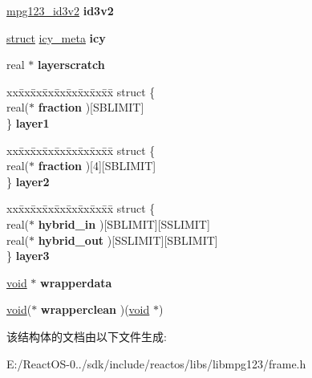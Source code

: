\begin{DoxyCompactItemize}
\hyperlink{structmpg123__id3v2}{mpg123\+\_\+id3v2} {\bfseries id3v2}
\item 
\mbox{\label{structmpg123__handle__struct_a3440b05432bb42929d1a075aa1b77ca1}} 
\hyperlink{interfacestruct}{struct} \hyperlink{structicy__meta}{icy\+\_\+meta} {\bfseries icy}
\item 
\mbox{\label{structmpg123__handle__struct_ab121656ea746d2254a9fa8f7f653523c}} 
real $\ast$ {\bfseries layerscratch}
\item 
\mbox{\label{structmpg123__handle__struct_a35ce61c3dc7ec33948852f9326d29561}} 
\begin{tabbing}
xx\=xx\=xx\=xx\=xx\=xx\=xx\=xx\=xx\=\kill
struct \{\\
\>real($\ast$ {\bfseries fraction} )\mbox{[}SBLIMIT\mbox{]}\\
\} {\bfseries layer1}\\

\end{tabbing}\item 
\mbox{\label{structmpg123__handle__struct_a0698b359b243a51d355a430501a6edb0}} 
\begin{tabbing}
xx\=xx\=xx\=xx\=xx\=xx\=xx\=xx\=xx\=\kill
struct \{\\
\>real($\ast$ {\bfseries fraction} )\mbox{[}4\mbox{]}\mbox{[}SBLIMIT\mbox{]}\\
\} {\bfseries layer2}\\

\end{tabbing}\item 
\mbox{\label{structmpg123__handle__struct_a5be7d45d0d61cc2506673bdf5a83ff58}} 
\begin{tabbing}
xx\=xx\=xx\=xx\=xx\=xx\=xx\=xx\=xx\=\kill
struct \{\\
\>real($\ast$ {\bfseries hybrid\_in} )\mbox{[}SBLIMIT\mbox{]}\mbox{[}SSLIMIT\mbox{]}\\
\>real($\ast$ {\bfseries hybrid\_out} )\mbox{[}SSLIMIT\mbox{]}\mbox{[}SBLIMIT\mbox{]}\\
\} {\bfseries layer3}\\

\end{tabbing}\item 
\mbox{\label{structmpg123__handle__struct_a985b82b2061206601ec52666cdaf5522}} 
\hyperlink{interfacevoid}{void} $\ast$ {\bfseries wrapperdata}
\item 
\mbox{\label{structmpg123__handle__struct_ad2b6173fa78bcdc092126f79c960082f}} 
\hyperlink{interfacevoid}{void}($\ast$ {\bfseries wrapperclean} )(\hyperlink{interfacevoid}{void} $\ast$)
\end{DoxyCompactItemize}


该结构体的文档由以下文件生成\+:\begin{DoxyCompactItemize}
\item 
E\+:/\+React\+O\+S-\/0../sdk/include/reactos/libs/libmpg123/frame.\+h\end{DoxyCompactItemize}
